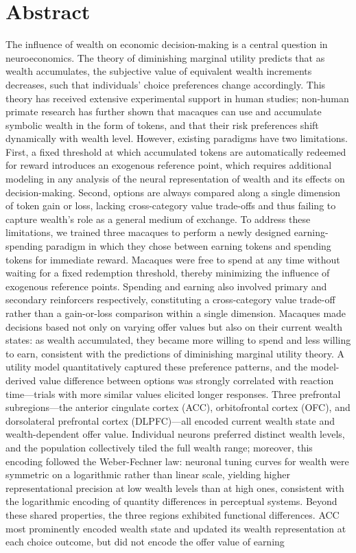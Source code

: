 \intobmk\chapter*{Abstract}%

The influence of wealth on economic decision-making is a central question in neuroeconomics. The theory of diminishing marginal utility predicts that as wealth accumulates, the subjective value of equivalent wealth increments decreases, such that individuals' choice preferences change accordingly. This theory has received extensive experimental support in human studies; non-human primate research has further shown that macaques can use and accumulate symbolic wealth in the form of tokens, and that their risk preferences shift dynamically with wealth level. However, existing paradigms have two limitations. First, a fixed threshold at which accumulated tokens are automatically redeemed for reward introduces an exogenous reference point, which requires additional modeling in any analysis of the neural representation of wealth and its effects on decision-making. Second, options are always compared along a single dimension of token gain or loss, lacking cross-category value trade-offs and thus failing to capture wealth's role as a general medium of exchange. To address these limitations, we trained three macaques to perform a newly designed earning-spending paradigm in which they chose between earning tokens and spending tokens for immediate reward. Macaques were free to spend at any time without waiting for a fixed redemption threshold, thereby minimizing the influence of exogenous reference points. Spending and earning also involved primary and secondary reinforcers respectively, constituting a cross-category value trade-off rather than a gain-or-loss comparison within a single dimension. Macaques made decisions based not only on varying offer values but also on their current wealth states: as wealth accumulated, they became more willing to spend and less willing to earn, consistent with the predictions of diminishing marginal utility theory. A utility model quantitatively captured these preference patterns, and the model-derived value difference between options was strongly correlated with reaction time---trials with more similar values elicited longer responses. Three prefrontal subregions---the anterior cingulate cortex (ACC), orbitofrontal cortex (OFC), and dorsolateral prefrontal cortex (DLPFC)---all encoded current wealth state and wealth-dependent offer value. Individual neurons preferred distinct wealth levels, and the population collectively tiled the full wealth range; moreover, this encoding followed the Weber-Fechner law: neuronal tuning curves for wealth were symmetric on a logarithmic rather than linear scale, yielding higher representational precision at low wealth levels than at high ones, consistent with the logarithmic encoding of quantity differences in perceptual systems. Beyond these shared properties, the three regions exhibited functional differences. ACC most prominently encoded wealth state and updated its wealth representation at each choice outcome, but did not encode the offer value of earning 